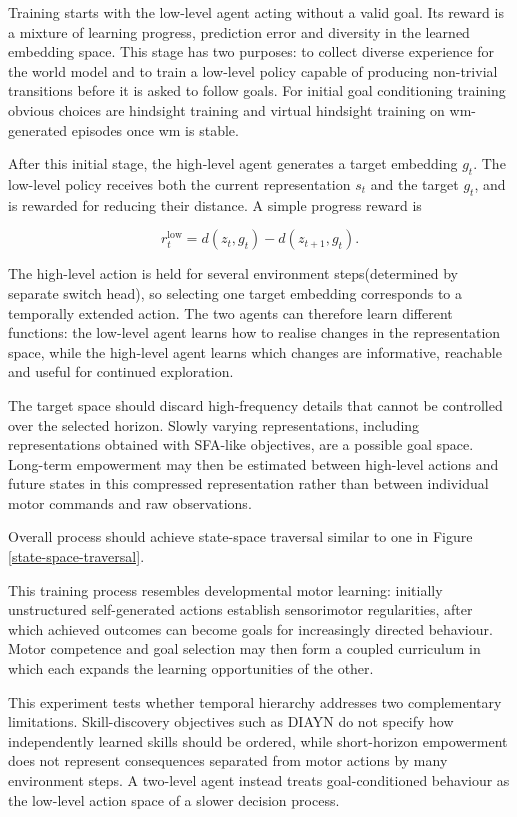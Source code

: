 Training starts with the low-level agent acting without a valid goal. Its reward is a mixture of learning progress, prediction error and diversity in the learned embedding space. This stage has two purposes: to collect diverse experience for the world model and to train a low-level policy capable of producing non-trivial transitions before it is asked to follow goals. For initial goal conditioning training obvious choices are hindsight training and virtual hindsight training on wm-generated episodes once wm is stable.

After this initial stage, the high-level agent generates a target embedding $g_t$. The low-level policy receives both the current representation $s_t$ and the target $g_t$, and is rewarded for reducing their distance. A simple progress reward is

\begin{equation}
r^{\mathrm{low}}_t = d(z_t,g_t)-d(z_{t+1},g_t).
\end{equation}

The high-level action is held for several environment steps(determined by separate switch head), so selecting one target embedding corresponds to a temporally extended action. The two agents can therefore learn different functions: the low-level agent learns how to realise changes in the representation space, while the high-level agent learns which changes are informative, reachable and useful for continued exploration.


The target space should discard high-frequency details that cannot be controlled over the selected horizon. Slowly varying representations, including representations obtained with SFA-like objectives, are a possible goal space. Long-term empowerment may then be estimated between high-level actions and future states in this compressed representation rather than between individual motor commands and raw observations.

Overall process should achieve state-space traversal similar to one in Figure \ref{state-space-traversal}.

This training process resembles developmental motor learning: initially unstructured self-generated actions establish sensorimotor regularities, after which achieved outcomes can become goals for increasingly directed behaviour. Motor competence and goal selection may then form a coupled curriculum in which each expands the  learning opportunities of the other.

This experiment tests whether temporal hierarchy addresses two complementary limitations. Skill-discovery objectives such as DIAYN do not specify how independently learned skills should be ordered, while short-horizon empowerment does not represent consequences separated from motor actions by many environment steps. A two-level agent instead treats goal-conditioned behaviour as the low-level action space of a slower decision process.







